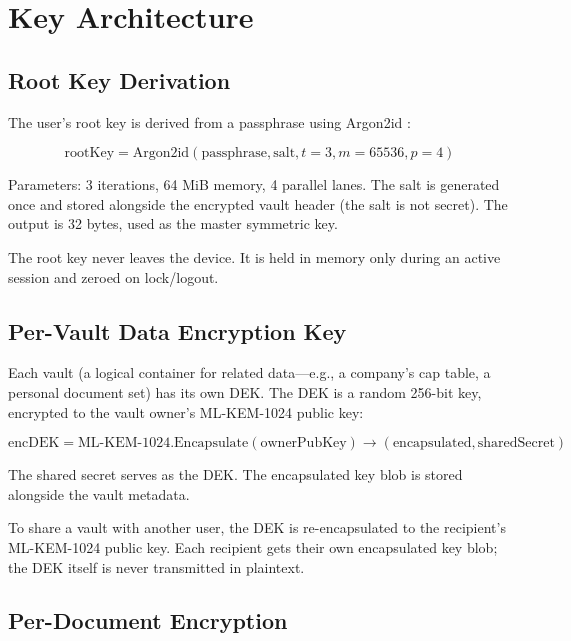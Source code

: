 \section{Key Architecture}

\label{sec:keys}

\subsection{Root Key Derivation}

The user's root key is derived from a passphrase using Argon2id
\cite{argon2}:

\begin{equation}
  \text{rootKey} = \text{Argon2id}(\text{passphrase}, \text{salt}, t=3, m=65536, p=4)
\end{equation}

Parameters: 3 iterations, 64 MiB memory, 4 parallel lanes.  The salt is
generated once and stored alongside the encrypted vault header (the salt
is not secret).  The output is 32 bytes, used as the master symmetric key.

The root key never leaves the device.  It is held in memory only during
an active session and zeroed on lock/logout.

\subsection{Per-Vault Data Encryption Key}

Each vault (a logical container for related data---e.g., a company's
cap table, a personal document set) has its own DEK.  The DEK is a random
256-bit key, encrypted to the vault owner's ML-KEM-1024 public key:

\begin{equation}
  \text{encDEK} = \text{ML-KEM-1024.Encapsulate}(\text{ownerPubKey}) \to (\text{encapsulated}, \text{sharedSecret})
\end{equation}

The shared secret serves as the DEK.  The encapsulated key blob is stored
alongside the vault metadata.

To share a vault with another user, the DEK is re-encapsulated to the
recipient's ML-KEM-1024 public key.  Each recipient gets their own
encapsulated key blob; the DEK itself is never transmitted in plaintext.

\subsection{Per-Document Encryption}

